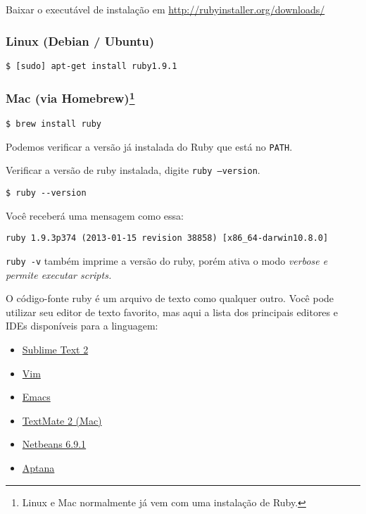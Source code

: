 \documentclass[serif,mathserif]{article}
\newcommand*{\Package}[1]{\texttt{#1}}%
\begin{document}
Baixar o executável de instalação em \url{http://rubyinstaller.org/downloads/}

\subsubsection{Linux (Debian / Ubuntu)}

\begin{lstlisting}[style=BashInputStyle]
$ [sudo] apt-get install ruby1.9.1
\end{lstlisting}

\subsubsection{Mac (via Homebrew)\footnote{Linux e Mac normalmente já vem com uma instalação de Ruby.}}

\begin{lstlisting}[style=BashInputStyle]
$ brew install ruby
\end{lstlisting}

Podemos verificar a versão já instalada do Ruby que está no \Package{PATH}.

Verificar a versão de ruby instalada, digite  \Package{ruby --version}.

\begin{lstlisting}[style=BashInputStyle]
$ ruby --version
\end{lstlisting}

Você receberá uma mensagem como essa:
\begin{lstlisting}[style=BashOutputStyle]
ruby 1.9.3p374 (2013-01-15 revision 38858) [x86_64-darwin10.8.0]
\end{lstlisting}

\Package{ruby -v} também imprime a versão do ruby, porém ativa o modo \em{verbose} e permite executar scripts.

O código-fonte ruby é um arquivo de texto como qualquer outro. Você pode utilizar seu editor de texto favorito, mas aqui a lista dos principais editores e IDEs
disponíveis para a linguagem: 

\begin{itemize}
  \item \href{http://www.sublimetext.com/2}{Sublime Text 2}
\item \href{http://www.vim.org/}{Vim}
\item \href{http://www.gnu.org/software/emacs/}{Emacs}
\item \href{https://github.com/textmate/textmate/}{TextMate 2 (Mac)}
\item \href{https://netbeans.org/downloads/6.9.1/index.html}{Netbeans 6.9.1}
\item \href{http://www.aptana.com/}{Aptana}
\end{itemize}
\end{document}
